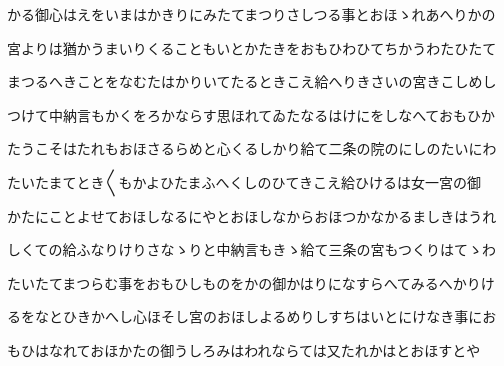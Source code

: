 \documentclass[a4paper,11pt,landscape]{ltjtarticle}
\begin{document}
\par\medskip
かる御心はえをいまはかきりにみたてまつりさしつる事とおほゝれあへりかの
\par\medskip
宮よりは猶かうまいりくることもいとかたきをおもひわひてちかうわたひたて
\par\medskip
まつるへきことをなむたはかりいてたるときこえ給へりきさいの宮きこしめし
\par\medskip
つけて中納言もかくをろかならす思ほれてゐたなるはけにをしなへておもひか
\par\medskip
たうこそはたれもおほさるらめと心くるしかり給て二条の院のにしのたいにわ
\par\medskip
たいたまてとき〱もかよひたまふへくしのひてきこえ給ひけるは女一宮の御
\par\medskip
かたにことよせておほしなるにやとおほしなからおほつかなかるましきはうれ
\par\medskip
しくての給ふなりけりさなゝりと中納言もきゝ給て三条の宮もつくりはてゝわ
\par\medskip
たいたてまつらむ事をおもひしものをかの御かはりになすらへてみるへかりけ
\par\medskip
るをなとひきかへし心ほそし宮のおほしよるめりしすちはいとにけなき事にお
\par\medskip
もひはなれておほかたの御うしろみはわれならては又たれかはとおほすとや
\par\medskip
\end{document}
